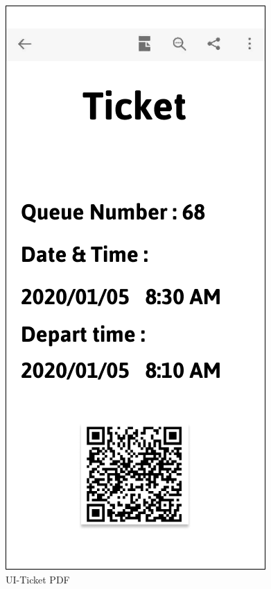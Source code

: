 \documentclass[a4paper,12pt]{report}
\begin{document}
\begin{figure}[H]
\begin{minipage}[t]{0.56\linewidth}
		\includegraphics[scale=0.5]{UI-TicketPDF}
		\caption{UI-Ticket PDF}
		\label{fig:UI-TicketPDF}
	\end{minipage}
\end{figure}
\end{document}

